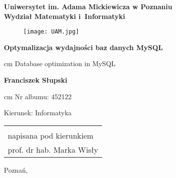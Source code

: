 \begin{titlepage}%
	
	\let\footnotesize\small
	\let\footnoterule\relax
	\let \footnote \thanks
	
	\begin{center}%
		{\Large \bf Uniwersytet im. Adama Mickiewicza w Poznaniu \\ Wydział Matematyki i~Informatyki\par}
	\end{center}%
	\vspace{-0.5 cm}
	\noindent\hrulefill
	
	\vspace{0.75cm plus 1mm minus 2mm}
	
	\setlength{\oddsidemargin}{0.2in}
	\begin{figure}[h]
		\label{UAM}
		\begin{center}
			\leavevmode
			\texttt{[image: UAM.jpg]}
		\end{center}
	\end{figure}
	\setlength{\oddsidemargin}{0.5in}
	
	\vspace{1 cm plus 1mm minus 2mm}
	
	\begin{center}%
		{\Large\textbf{Optymalizacja wydajności baz danych MySQL}\par
			 cm
			{\large Database optimization in MySQL} }
		
		\vspace{1.0cm plus 1fill}
		\begin{flushleft}%
			{\center 
				\Large\textbf{Franciszek Słupski}\par
				 cm
				\small 
				Nr albumu: 452122\par
				Kierunek: Informatyka\par
			}
			
		\end{flushleft}%
		
		\vspace{1.7cm plus 1.5fill}
		
		\begin{flushright}\large
			\begin{tabular}{l}
				{\small Praca magisterska \\
					\small napisana pod kierunkiem \\
					\small prof. dr hab. Marka Wisły 
				}
			\end{tabular}
		\end{flushright}
		
		\vspace{2cm plus .1fill}
		{Poznań,\par}
	\end{center}
\end{titlepage}%
